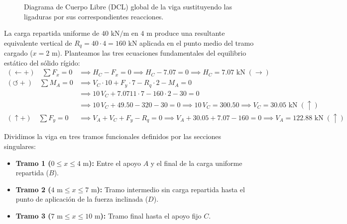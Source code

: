\begin{figure}[H]
{%
    }
    \caption{Diagrama de Cuerpo Libre (DCL) global de la viga sustituyendo las ligaduras por sus correspondientes reacciones.}
    \label{fig:ejemplo6_dcl}
\end{figure}


La carga repartida uniforme de $40\text{ kN/m}$ en $4\text{ m}$ produce una resultante equivalente vertical de $R_q = 40 \cdot 4 = 160\text{ kN}$ aplicada en el punto medio del tramo cargado ($x = 2\text{ m}$). Planteamos las tres ecuaciones fundamentales del equilibrio estático del sólido rígido:
\begin{align}
    (\leftarrow +) \quad \sum F_x = 0       & \implies H_C - F_x = 0 \implies H_C - 7.07 = 0 \implies \boxed{H_C = 7.07\text{ kN}\;(\rightarrow)}                          \\
    (\circlearrowleft +) \quad \sum M_A = 0 & \implies V_C \cdot 10 + F_y \cdot 7 - R_q \cdot 2 - M_A = 0 \nonumber                                                        \\
                                            & \implies 10\,V_C + 7.0711 \cdot 7 - 160 \cdot 2 - 30 = 0 \nonumber                                                           \\
                                            & \implies 10\,V_C + 49.50 - 320 - 30 = 0 \implies 10\,V_C = 300.50 \implies \boxed{V_C = 30.05\text{ kN}\;(\uparrow)}         \\
    (\uparrow +) \quad \sum F_y = 0         & \implies V_A + V_C + F_y - R_q = 0 \implies V_A + 30.05 + 7.07 - 160 = 0 \implies \boxed{V_A = 122.88\text{ kN}\;(\uparrow)}
\end{align}


Dividimos la viga en tres tramos funcionales definidos por las secciones singulares:
\begin{itemize}
    \item \textbf{Tramo 1 ($0 \le x \le 4\text{ m}$):} Entre el apoyo $A$ y el final de la carga uniforme repartida ($B$).
    \item \textbf{Tramo 2 ($4\text{ m} \le x \le 7\text{ m}$):} Tramo intermedio sin carga repartida hasta el punto de aplicación de la fuerza inclinada ($D$).
    \item \textbf{Tramo 3 ($7\text{ m} \le x \le 10\text{ m}$):} Tramo final hasta el apoyo fijo $C$.
\end{itemize}

